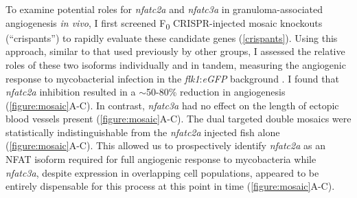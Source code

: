 To examine potential roles for \textit{nfatc2a} and \textit{nfatc3a} in granuloma\hyp{}associated angiogenesis \textit{in vivo}, I first screened F\textsubscript{0} CRISPR\hyp{}injected mosaic knockouts (``crispants'') to rapidly evaluate these candidate genes (\autoref{crispants}). Using this approach, similar to that used previously by other groups, I assessed the relative roles of these two isoforms individually and in tandem, measuring the angiogenic response to mycobacterial infection in the \textit{flk1}:\textit{eGFP} background \citep{Jao2013, Hoshijima2016, Wu2018, Hoshijima2019, Kroll2021}. I found that \textit{nfatc2a} inhibition resulted in a $\sim$50\hyp{}80\% reduction in angiogenesis (\autoref{figure:mosaic}A\hyp{}C). In contrast, \textit{nfatc3a} had no effect on the length of ectopic blood vessels present (\autoref{figure:mosaic}A\hyp{}C). The dual targeted double mosaics were statistically indistinguishable from the \textit{nfatc2a} injected fish alone (\autoref{figure:mosaic}A\hyp{}C). This allowed us to prospectively identify \textit{nfatc2a} as an NFAT isoform required for full angiogenic response to mycobacteria while \textit{nfatc3a}, despite expression in overlapping cell populations, appeared to be entirely dispensable for this process at this point in time (\autoref{figure:mosaic}A\hyp{}C). 

